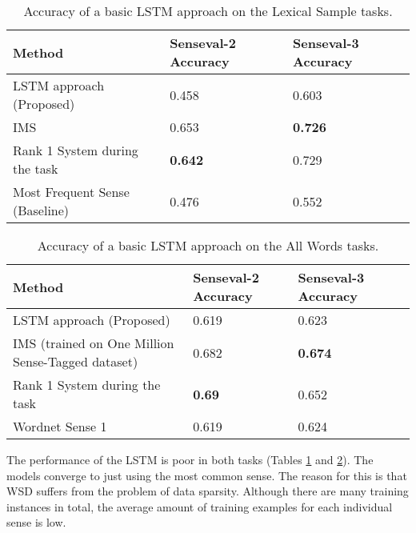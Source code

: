 \begin{table}[th]
	\caption{Accuracy of a basic LSTM approach on the Lexical
          Sample tasks.}
	\label{table:NN-LS}
	\begin{center}
		\begin{tabular}{| p{6cm} | p{4cm} | p{4cm} |}
			\hline
			Method & Senseval-2 Accuracy & Senseval-3 Accuracy \\
			\hline
			LSTM approach (Proposed) & 0.458  & 0.603 \\
			\hline
			IMS & 0.653 & {\bf0.726}\\
			\hline
			Rank 1 System during the task & {\bf0.642} & 0.729 \\
			\hline
			Most Frequent Sense (Baseline) & 0.476 & 0.552 \\
			\hline
		\end{tabular}
	\end{center}
\end{table}

\begin{table}[th]
	\caption{Accuracy of a basic LSTM approach on the All Words tasks.}
	\label{table:NN_AW}
	\begin{center}
		\begin{tabular}{| p{7cm} | p{2cm} | p{2cm} | p{2cm} | }
			\hline
			Method & Senseval-2 Accuracy & Senseval-3 Accuracy\\
			\hline
			LSTM approach (Proposed) & 0.619  & 0.623  \\
			
			\hline
			IMS (trained on One Million Sense-Tagged dataset) & 0.682 & {\bf0.674} \\
			\hline
			Rank 1 System during the task & {\bf0.69} & 0.652  \\
			\hline
			Wordnet Sense 1 & 0.619 & 0.624  \\
			\hline
		\end{tabular}
	\end{center}
\end{table}

The performance of the LSTM is poor in both tasks (Tables
\ref{table:NN-LS} and \ref{table:NN_AW}). 
The models converge to just
using the most common sense. The reason for this is that WSD suffers
from the problem of data sparsity. Although there are many training
instances in total, the average amount of training examples for each
individual sense is low.

